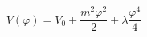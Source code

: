 \begin{equation}
 V(\varphi){=}V_{0}+\frac{m^{2}\varphi^{2}}{2}
 + \lambda\frac{\varphi^{4}}{4}
\end{equation}

